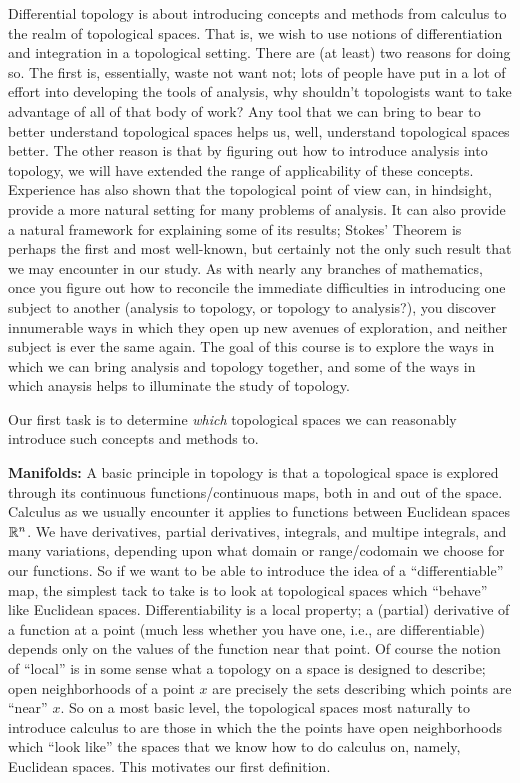Differential topology is about introducing concepts and methods from calculus to the
realm of topological spaces. That is, we wish to use notions of differentiation
and integration in a topological setting. There are (at least) two reasons for doing
so. The first is, essentially, waste not want not; lots of people have put in a lot
of effort into developing the tools of analysis, why shouldn't topologists want to take
advantage of all of that body of work? Any tool that we can bring to bear to better
understand topological spaces helps us, well, understand topological spaces better.
The other reason is that by figuring out how to introduce analysis into topology,
we will have extended the range of applicability of these concepts. Experience has
also shown that the topological point of view can, in hindsight, provide a more natural
setting for many problems of analysis. It can also provide a natural framework for
explaining some of its results; Stokes' Theorem is perhaps the first and most well-known,
but certainly not the only such result that we may encounter in our study.
As with nearly any branches of mathematics,
once you figure out how to reconcile the immediate difficulties in introducing one
subject to another (analysis to topology, or topology to analysis?), you discover
innumerable ways in which they open up new avenues of exploration, and neither 
subject is ever the same again. The goal of this course is to explore the ways in 
which we can bring analysis and topology together, and some of the ways in which 
anaysis helps to illuminate the study of topology.

\msk

Our first task is to determine {\it which} topological
spaces we can reasonably introduce such concepts and methods to.

\ssk

{\bf Manifolds:} A basic principle in topology is that a topological space is explored
through its continuous functions/continuous maps, both in and out of the space. 
Calculus as we usually encounter it applies to functions between Euclidean spaces
${\Bbb R}^n$. We have derivatives, partial derivatives, integrals, and multipe integrals,
and many variations, depending upon what domain or range/codomain we choose for 
our functions. So if we want to be able to introduce the idea of a ``differentiable''
map, the simplest tack to take is to look at topological spaces which ``behave''
like Euclidean spaces. Differentiability is a local property; a (partial) derivative
of a function at a point (much less whether you have one, i.e., are
differentiable) depends only on the values of the function near that point.
Of course the notion of ``local'' is in some sense what a topology on a space
is designed to describe; open neighborhoods of a point $x$ are precisely the sets
describing which points are ``near'' $x$. So on a most basic level, the topological 
spaces most naturally to introduce calculus to are those in which the the points have
open neighborhoods which ``look like'' the spaces that we know how to do calculus on,
namely, Euclidean spaces. This motivates our first definition.

